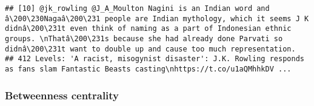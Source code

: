 \documentclass[]{article}
\newenvironment{Shaded}{\begin{snugshade}}{\end{snugshade}}
\newcommand{\KeywordTok}[1]{\textcolor[rgb]{0.13,0.29,0.53}{\textbf{#1}}}
\newcommand{\DataTypeTok}[1]{\textcolor[rgb]{0.13,0.29,0.53}{#1}}
\newcommand{\DecValTok}[1]{\textcolor[rgb]{0.00,0.00,0.81}{#1}}
\newcommand{\OtherTok}[1]{\textcolor[rgb]{0.56,0.35,0.01}{#1}}
\newcommand{\OperatorTok}[1]{\textcolor[rgb]{0.81,0.36,0.00}{\textbf{#1}}}
\newcommand{\NormalTok}[1]{#1}
\begin{document}
\begin{verbatim}
## [10] @jk_rowling @J_A_Moulton Nagini is an Indian word and â\200\230Nagaâ\200\231 people are Indian mythology, which it seems J K didnâ\200\231t even think of naming as a part of Indonesian ethnic groups. \nThatâ\200\231s because she had already done Parvati so didnâ\200\231t want to double up and cause too much representation.
## 412 Levels: 'A racist, misogynist disaster': J.K. Rowling responds as fans slam Fantastic Beasts casting\nhttps://t.co/u1aQMhhkDV ...
\end{verbatim}

\subsubsection{Betweenness centrality}\label{betweenness-centrality}

\begin{Shaded}
\end{Shaded}
\end{document}

